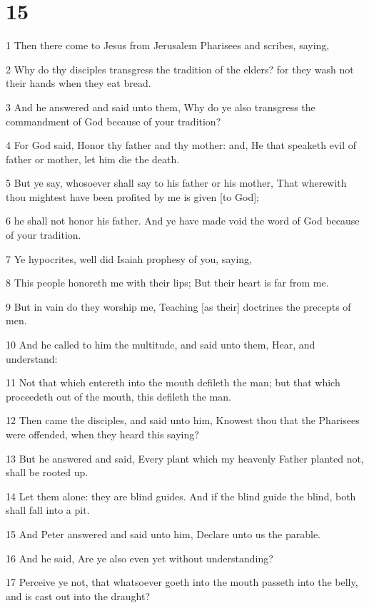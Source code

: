 \chapter{15}

\par 1 Then there come to Jesus from Jerusalem Pharisees and scribes, saying,
\par 2 Why do thy disciples transgress the tradition of the elders? for they wash not their hands when they eat bread.
\par 3 And he answered and said unto them, Why do ye also transgress the commandment of God because of your tradition?
\par 4 For God said, Honor thy father and thy mother: and, He that speaketh evil of father or mother, let him die the death.
\par 5 But ye say, whosoever shall say to his father or his mother, That wherewith thou mightest have been profited by me is given [to God];
\par 6 he shall not honor his father. And ye have made void the word of God because of your tradition.
\par 7 Ye hypocrites, well did Isaiah prophesy of you, saying,
\par 8 This people honoreth me with their lips; But their heart is far from me.
\par 9 But in vain do they worship me, Teaching [as their] doctrines the precepts of men.
\par 10 And he called to him the multitude, and said unto them, Hear, and understand:
\par 11 Not that which entereth into the mouth defileth the man; but that which proceedeth out of the mouth, this defileth the man.
\par 12 Then came the disciples, and said unto him, Knowest thou that the Pharisees were offended, when they heard this saying?
\par 13 But he answered and said, Every plant which my heavenly Father planted not, shall be rooted up.
\par 14 Let them alone: they are blind guides. And if the blind guide the blind, both shall fall into a pit.
\par 15 And Peter answered and said unto him, Declare unto us the parable.
\par 16 And he said, Are ye also even yet without understanding?
\par 17 Perceive ye not, that whatsoever goeth into the mouth passeth into the belly, and is cast out into the draught?
